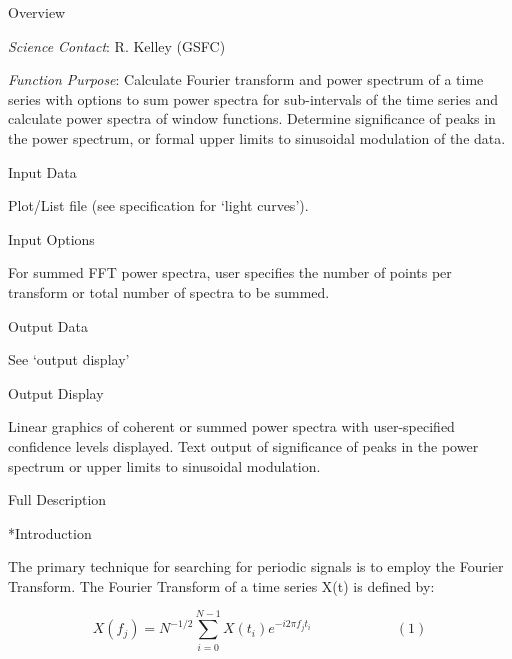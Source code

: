 %
\def\version{\it Rev. 1.0 - 3/12/86}
\def\chapter{\it Timing Analysis: Periodogram analysis}

\@{Overview}

\noindent
{\it Science Contact}:  R. Kelley (GSFC)

\noindent
{\it Function Purpose}:  Calculate Fourier transform and power spectrum of a
time series with options to sum power spectra for sub-intervals of the
time series and calculate power spectra of window functions.
Determine significance of peaks in the power spectrum, or formal upper
limits to sinusoidal modulation of the data.

\@{Input Data}

\item{}Plot/List file (see specification for `light curves').

\@{Input Options}

\item{}For summed FFT power spectra, user specifies the number of points per
transform or total number of spectra to be summed.

\@{Output Data}

\item{}See `output display'

\@{Output Display}

\item{}Linear graphics of coherent or summed power spectra with
user-specified confidence levels displayed.  Text output of
significance of peaks in the power spectrum or upper limits to
sinusoidal modulation.

\@{Full Description}

\**Introduction

{\list

The primary technique for searching for periodic signals is to employ the
Fourier Transform.  The Fourier Transform of a time series X(t) is defined
by:

}

$$X(f_{j}) = N^{-1/2}\sum_{i=0}^{N-1} X(t_{i})e^{-i2\pi f_{j}t_{i}} \qquad\qquad\qquad(1)$$

